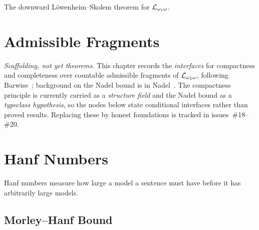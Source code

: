 The downward L\"owenheim--Skolem theorem for $\mathcal{L}_{\omega_1\omega}$.




\chapter{Admissible Fragments}

\emph{Scaffolding, not yet theorems.}  This chapter records the \emph{interfaces}
for compactness and completeness over countable admissible fragments of
$\mathcal{L}_{\omega_1\omega}$, following Barwise~\cite{barwise1975}; background on the Nadel bound
is in Nadel~\cite{nadel1974}.  The compactness principle is currently carried as a
\emph{structure field} and the Nadel bound as a \emph{typeclass hypothesis}, so the
nodes below state conditional interfaces rather than proved results.  Replacing
these by honest foundations is tracked in issues~\#18--\#20.




\chapter{Hanf Numbers}

Hanf numbers measure how large a model a sentence must have before
it has arbitrarily large models.





\section{Morley--Hanf Bound}

